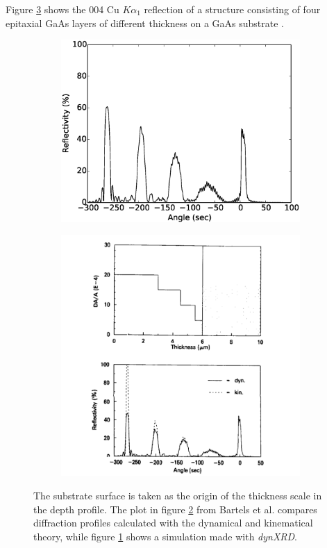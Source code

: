 \documentclass[12pt,oneside,notitlepage,abstracton,a4paper]{scrartcl}
\begin{document}
Figure \ref{GaAs_both} shows the 004 Cu $K\alpha_1$ reflection of a structure consisting of four epitaxial GaAs layers of different thickness on a GaAs substrate \cite{Bartels:a25435}. 
\begin{figure}[h]
 \centering
 \begin{subfigure}[h]{0.49\textwidth}
  \includegraphics[width=\textwidth]{pics/GaAs.eps}
  \caption{}
  \label{GaAs}
 \end{subfigure}
 \begin{subfigure}[h]{0.50\textwidth}
  \includegraphics[width=1.2\textwidth]{pics/GaAs.png}
  \caption{}
  \label{GaAs_article}
 \end{subfigure}
 \caption{The substrate surface is taken as the origin of the thickness scale in the depth profile. The plot in figure \ref{GaAs_article} from Bartels et al. \cite{Bartels:a25435} compares diffraction profiles calculated with the dynamical and kinematical theory, while figure \ref{GaAs} shows a simulation made with \textit{dynXRD}.
}\label{GaAs_both}
\end{figure}
\end{document}
